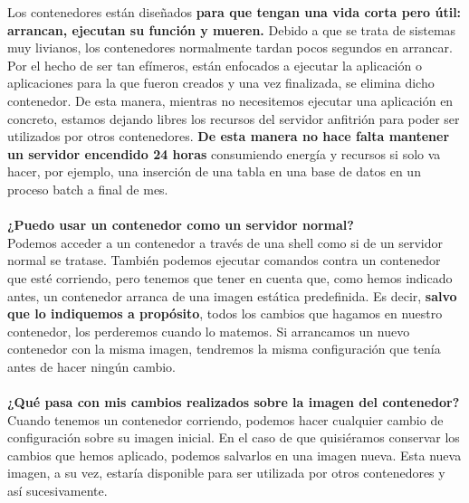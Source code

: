 \documentclass[twoside,twocolumn]{article}
\begin{document}
\begin{flushright}
\begin{itemize}
Los contenedores están diseñados \textbf{para que tengan una vida corta pero útil: arrancan, ejecutan su función y mueren.} Debido a que se trata de sistemas muy livianos, los contenedores normalmente tardan pocos segundos en arrancar. Por el hecho de ser tan efímeros, están enfocados a ejecutar la aplicación o aplicaciones para la que fueron creados y una vez finalizada, se elimina dicho contenedor. De esta manera, mientras no necesitemos ejecutar una aplicación en concreto, estamos dejando libres los recursos del servidor anfitrión para poder ser utilizados por otros contenedores. \textbf{De esta manera no hace falta mantener un servidor encendido 24 horas} consumiendo energía y recursos si solo va hacer, por ejemplo, una inserción de una tabla en una base de datos en un proceso batch a final de mes.
\textbf{}\\
\textbf{}\\
\textbf{¿Puedo usar un contenedor como un servidor normal?}\\
Podemos acceder a un contenedor a través de una shell como si de un servidor normal se tratase. También podemos ejecutar comandos contra un contenedor que esté corriendo, pero tenemos que tener en cuenta que, como hemos indicado antes, un contenedor arranca de una imagen estática predefinida. Es decir, \textbf{salvo que lo indiquemos a propósito}, todos los cambios que hagamos en nuestro contenedor, los perderemos cuando lo matemos. Si arrancamos un nuevo contenedor con la misma imagen, tendremos la misma configuración que tenía antes de hacer ningún cambio.
\textbf{}\\
\textbf{}\\
\textbf{¿Qué pasa con mis cambios realizados sobre la imagen del contenedor?}\\
Cuando tenemos un contenedor corriendo, podemos hacer cualquier cambio de configuración sobre su imagen inicial. En el caso de que quisiéramos conservar los cambios que hemos aplicado, podemos salvarlos en una imagen nueva. Esta nueva imagen, a su vez, estaría disponible para ser utilizada por otros contenedores y así sucesivamente.

\textbf{}\\
\textbf{}\\



\end{itemize}
\end{flushright}
\end{document}
